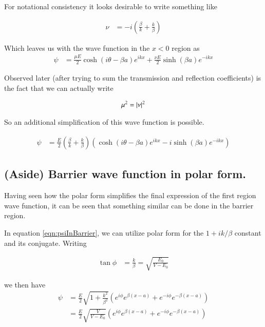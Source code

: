 \documentclass{article}
\begin{document}
For notational consistency it looks desirable to write something like

\begin{align}\label{eqn:nuDefined}
\nu &= -i \left(\frac{\beta}{k} + \frac{k}{\beta} \right) 
\end{align}

Which leaves us with the wave function in the $x<0$ region as
\begin{align}\label{eqn:incidentAndReflected}
\psi &=
\frac{\mu E}{2}\cosh\left( i\theta -\beta a \right) e^{ i k x }
+\frac{\nu E}{2}\sinh\left( \beta a \right) e^{ -i k x }
\end{align}

Observed later (after trying to sum the transmission and reflection coefficients) is the fact that we can actually write

\begin{align*}
\mu^2 = \left\lvert{\nu}\right\rvert^2
\end{align*}

So an additional simplification of this wave function is possible.

\begin{align}\label{eqn:incidentAndReflectedSimplified}
\psi &=
\frac{E}{2} \left(\frac{\beta}{k} + \frac{k}{\beta} \right) 
\left(
\cosh\left( i\theta -\beta a \right) e^{ i k x }
-i \sinh\left( \beta a \right) e^{ -i k x }
\right)
\end{align}

\subsection{ (Aside) Barrier wave function in polar form. }

Having seen how the polar form simplifies the final expression of the first region wave function, it can be seen that 
something similar can be done in the barrier region.  

In equation \ref{eqn:psiInBarrier}, we can utilize polar form for the $1+ik/\beta$ constant and its conjugate.  Writing

\begin{align}
\tan\phi &= \frac{k}{\beta} = \sqrt{\frac{E_0}{V-E_0}}
\end{align}

we then have
\begin{align*}
\psi 
&=
\frac{E}{2}\sqrt{1 + \frac{k^2}{\beta^2}} \left( e^{i\phi} e^{ \beta(x-a)} + e^{-i\phi} e^{ -\beta(x-a)} \right) \\
&=
\frac{E}{2}\sqrt{\frac{V}{V-E_0}} \left( e^{i\phi} e^{ \beta(x-a)} + e^{-i\phi} e^{ -\beta(x-a)} \right) \\
\end{align*}
\end{document}
